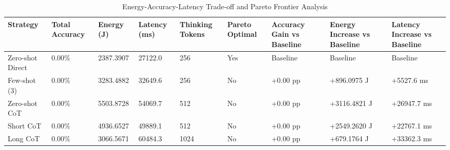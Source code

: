 \begin{table}
\caption{Energy-Accuracy-Latency Trade-off and Pareto Frontier Analysis}
\label{tab:tradeoff_comparison}
\begin{tabular}{lllllllll}
\toprule
Strategy & Total Accuracy & Energy (J) & Latency (ms) & Thinking Tokens & Pareto Optimal & Accuracy Gain vs Baseline & Energy Increase vs Baseline & Latency Increase vs Baseline \\
\midrule
Zero-shot Direct & 0.00\% & 2387.3907 & 27122.0 & 256 & Yes & Baseline & Baseline & Baseline \\
Few-shot (3) & 0.00\% & 3283.4882 & 32649.6 & 256 & No & +0.00 pp & +896.0975 J & +5527.6 ms \\
Zero-shot CoT & 0.00\% & 5503.8728 & 54069.7 & 512 & No & +0.00 pp & +3116.4821 J & +26947.7 ms \\
Short CoT & 0.00\% & 4936.6527 & 49889.1 & 512 & No & +0.00 pp & +2549.2620 J & +22767.1 ms \\
Long CoT & 0.00\% & 3066.5671 & 60484.3 & 1024 & No & +0.00 pp & +679.1764 J & +33362.3 ms \\
\bottomrule
\end{tabular}
\end{table}
